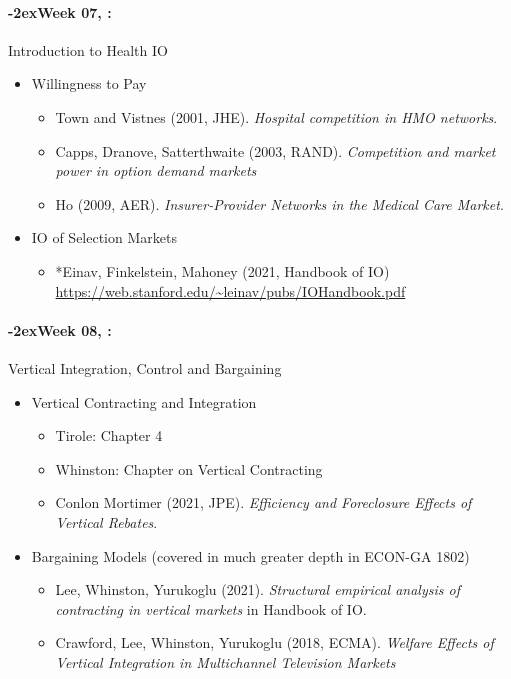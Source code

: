 \documentclass[11pt]{article}
\newcommand{\week}[1]{%
  \sbox{\weekdatebox}{\syldate{\today}}%
  \paragraph*{\kern-2ex\quad #1, \usebox{\weekdatebox}:}%
  \AdvanceDate[7]%
}
\begin{document}
\week{Week 07} Introduction to Health IO
\begin{itemize}
\item Willingness to Pay
\begin{itemize}
\item Town and Vistnes (2001, JHE). \textit{Hospital competition in HMO networks}.
\item Capps, Dranove, Satterthwaite (2003, RAND). \textit{Competition and market power in option demand markets}
\item Ho (2009, AER). \textit{Insurer-Provider Networks in the Medical Care Market}.
\end{itemize}
\item IO of Selection Markets
\begin{itemize}
  \item *Einav, Finkelstein, Mahoney (2021, Handbook of IO) \url{https://web.stanford.edu/~leinav/pubs/IOHandbook.pdf}
\end{itemize}
\end{itemize}



\week{Week 08} Vertical Integration, Control and Bargaining
\begin{itemize}
\item Vertical Contracting and Integration
\begin{itemize}
\item Tirole: Chapter 4
\item Whinston: Chapter on Vertical Contracting
\item Conlon Mortimer (2021, JPE). \textit{Efficiency and Foreclosure Effects of Vertical Rebates}.
\end{itemize}
\item Bargaining Models (covered in much greater depth in ECON-GA 1802)
\begin{itemize}
\item Lee, Whinston, Yurukoglu (2021). \textit{Structural empirical analysis of contracting in vertical markets} in Handbook of IO.
\item Crawford, Lee, Whinston, Yurukoglu (2018, ECMA). \textit{Welfare Effects of Vertical Integration in Multichannel Television Markets}
\end{itemize}
\end{itemize}
\end{document}
